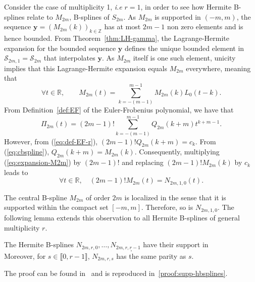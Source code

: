\begin{example}\label{ex:N0}
  Consider the case of multiplicity 1, \textit{i.e} $r=1$, in order to see how Hermite B-splines relate to $M_{2m}$, 
  B-splines of $S_{2m}$. As $M_{2m}$ is supported in $(-m,m)$, the sequence ${\bm{y} = {(M_{2m}(k))}_{k \in 
  \mathbb{Z}}}$ has at most $2m-1$ non zero elements and is hence bounded. From Theorem~\ref{thm:LH-gamma}, the 
  Lagrange-Hermite expansion for the bounded sequence $\bm{y}$ defines the unique bounded element in $\mathscr{S}_{2m,1} 
  = \mathscr{S}_{2m}$ that interpolates $\bm{y}$.  As $M_{2m}$ itself is one such element, unicity implies that this 
  Lagrange-Hermite expansion equals $M_{2m}$ everywhere, meaning that \begin{equation}\label{eq:expansion-M2m}
    \forall t \in \mathbb{R}, \qquad M_{2m}(t) = \sum_{k=-(m-1)}^{m-1} M_{2m}(k) L_0(t-k).
  \end{equation}
  From Definition~\ref{def:EF} of the Euler-Frobenius polynomial, we have that
  \begin{equation*}
    \Pi_{2m}(t) = (2m-1)! \sum_{k=-(m-1)}^{m-1} Q_{2m}(k+m) t^{k+m-1}.
  \end{equation*}
  However, from (\ref{eq:def-EF-r}), $(2m-1)!Q_{2m}(k+m)=c_k$. From (\ref{eq:cbspline}), ${Q_{2m}(k+m) = M_{2m}(k)}$.  
  Consequently, multiplying (\ref{eq:expansion-M2m}) by $(2m-1)! $ and replacing $(2m-1)!M_{2m}(k)$ by $c_k$ leads to
  \begin{equation*}
    \forall t \in \mathbb{R}, \quad (2m-1)!M_{2m}(t) = N_{2m,1,0}(t).
  \end{equation*}
\end{example}
The central B-spline $M_{2m}$ of order $2m$ is localized in the sense that it is supported within the compact set 
$[-m,m]$. Therefore, so is $N_{2m,1,0}$. The following lemma extends this observation to all Hermite B-splines of 
general multiplicity $r$.

\begin{lem}\label{lemma:supp-hbsplines}
  The Hermite B-splines $N_{2m,r,0}, \ldots, N_{2m,r,r-1}$ have their support in
  \begin{equation*}
    [-(m-r+1), m-r+1].
  \end{equation*}
  Moreover, for $s \in \llbracket0,r-1\rrbracket$, $N_{2m,r,s}$ has the same parity as $s$.
\end{lem}
The proof can be found in~\cite{schoenberg_cardinal_1973} and is reproduced in~\ref{proof:supp-hbsplines}. 


